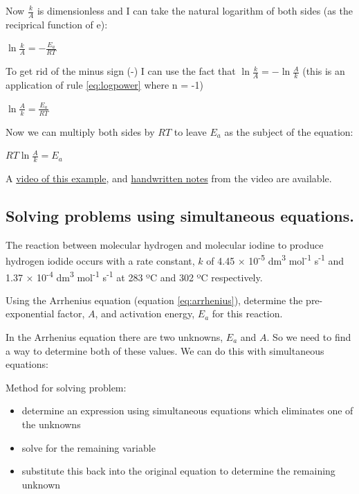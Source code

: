 \documentclass[
]{book}
\providecommand{\tightlist}{%
  \setlength{\itemsep}{0pt}\setlength{\parskip}{0pt}}
\begin{document}
Now \(\frac{k}{A}\) is dimensionless and I can take the natural logarithm of both sides (as the reciprical function of e):

\(\ln\frac{k}{A}=-\frac{E_a}{RT}\)

To get rid of the minus sign (-) I can use the fact that \(\ln\frac{k}{A}=-\ln\frac{A}{k}\) (this is an application of rule \eqref{eq:logpower} where n = -1)

\(\ln\frac{A}{k}=\frac{E_a}{RT}\)

Now we can multiply both sides by \(RT\) to leave \(E_a\) as the subject of the equation:

\(RT \ln\frac{A}{k}=E_a\)

A \href{https://youtu.be/55Cqx42kIrY}{video of this example}, and \href{http://workitoutwithapencil.xyz/wp-content/uploads/2021/07/Rearranging-the-Arrhenius-equation.pdf}{handwritten notes} from the video are available.

\hypertarget{solving-problems-using-simultaneous-equations.}{%
\subsection{Solving problems using simultaneous equations.}\label{solving-problems-using-simultaneous-equations.}}

The reaction between molecular hydrogen and molecular iodine to produce hydrogen iodide occurs with a rate constant, \(k\) of 4.45 × 10\textsuperscript{-5} dm\textsuperscript{3} mol\textsuperscript{-1} s\textsuperscript{-1} and 1.37 × 10\textsuperscript{-4} dm\textsuperscript{3} mol\textsuperscript{-1} s\textsuperscript{-1} at 283 ºC and 302 ºC respectively.

Using the Arrhenius equation (equation \eqref{eq:arrhenius}), determine the pre-exponential factor, \(A\), and activation energy, \(E_a\) for this reaction.

In the Arrhenius equation there are two unknowns, \(E_a\) and \(A\). So we need to find a way to determine both of these values. We can do this with simultaneous equations:

Method for solving problem:

\begin{itemize}
\tightlist
\item
  determine an expression using simultaneous equations which eliminates one of the unknowns
\item
  solve for the remaining variable
\item
  substitute this back into the original equation to determine the remaining unknown
\end{itemize}
\end{document}
